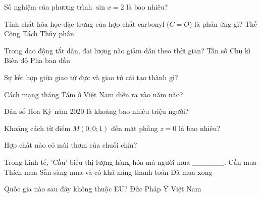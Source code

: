 \begin{ex}
    Số nghiệm của phương trình $\sin x = 2$ là bao nhiêu?
\end{ex}
\begin{ex}
    Tính chất hóa học đặc trưng của hợp chất carbonyl ($C=O$) là phản ứng gì?
    \choice
    {Thế}
    {\True Cộng}
    {Tách}
    {Thủy phân}
\end{ex}
\begin{ex}
    Trong dao động tắt dần, đại lượng nào giảm dần theo thời gian?
    \choice
    {Tần số}
    {Chu kì}
    {\True Biên độ}
    {Pha ban đầu}
\end{ex}
\begin{ex}
    Sự kết hợp giữa giao tử đực và giao tử cái tạo thành gì?
\end{ex}
\begin{ex}
    Cách mạng tháng Tám ở Việt Nam diễn ra vào năm nào?
\end{ex}
\begin{ex}
    Dân số Hoa Kỳ năm 2020 là khoảng bao nhiêu triệu người?
\end{ex}
\begin{ex}
    Khoảng cách từ điểm $M(0;0;1)$ đến mặt phẳng $z=0$ là bao nhiêu?
\end{ex}
\begin{ex}
    Hợp chất nào có mùi thơm của chuối chín?
\end{ex}
\begin{ex}
    Trong kinh tế, 'Cầu' biểu thị lượng hàng hóa mà người mua ______.
    \choice
    {Cần mua}
    {Thích mua}
    {\True Sẵn sàng mua và có khả năng thanh toán}
    {Đã mua xong}
\end{ex}
\begin{ex}
    Quốc gia nào sau đây không thuộc EU?
    \choice
    {Đức}
    {Pháp}
    {Ý}
    {\True Việt Nam}
\end{ex}
